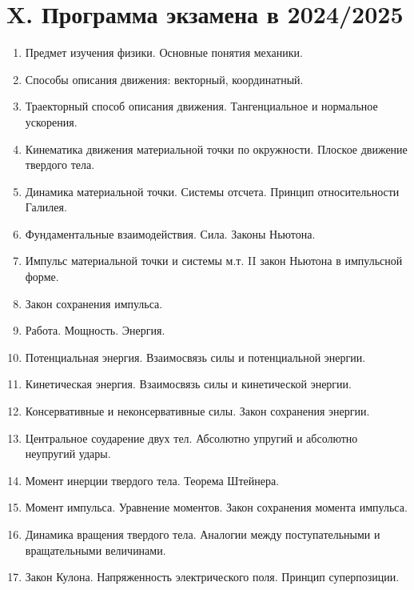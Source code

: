 \documentclass[12pt]{article}
\begin{document}




    \clearpage

    \section{X. Программа экзамена в 2024/2025}

    \begin{enumerate}
        \item Предмет изучения физики. Основные понятия механики.  
        \item Способы описания движения: векторный, координатный.  
        \item Траекторный способ описания движения. Тангенциальное и нормальное ускорения. 
        \item Кинематика движения материальной точки по окружности. Плоское движение твердого 
        тела.  
        \item Динамика материальной точки. Системы отсчета. Принцип относительности Галилея. 
        \item Фундаментальные взаимодействия. Сила. Законы Ньютона. 
        \item Импульс материальной точки и системы м.т. II закон Ньютона в импульсной форме.  
        \item Закон сохранения импульса. 
        \item Работа. Мощность. Энергия.  
        \item Потенциальная энергия. Взаимосвязь силы и потенциальной энергии. 
        \item Кинетическая энергия. Взаимосвязь силы и кинетической энергии. 
        \item Консервативные и неконсервативные силы. Закон сохранения энергии.  
        \item Центральное соударение двух тел. Абсолютно упругий и абсолютно неупругий удары.  
        \item Момент инерции твердого тела. Теорема Штейнера. 
        \item Момент импульса. Уравнение моментов. Закон сохранения момента импульса.  
        \item Динамика вращения твердого тела. Аналогии между поступательными и вращательными 
        величинами. 
        \item Закон Кулона. Напряженность электрического поля. Принцип суперпозиции. 

\end{enumerate}
\end{document}

